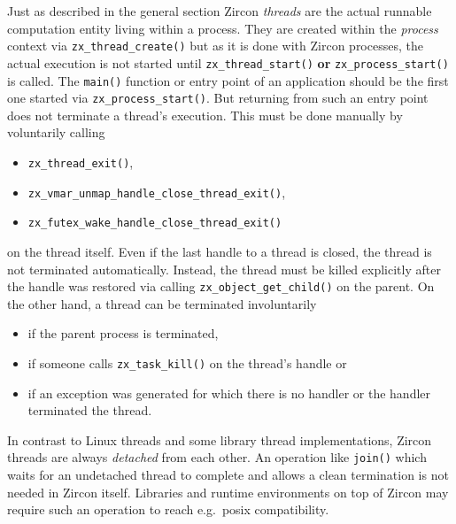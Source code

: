 Just as described in the general section Zircon \textit{threads} are the actual runnable computation entity living within a process.
They are created within the \textit{process} context via \texttt{zx\_thread\_create()} but as it is done with Zircon processes, the actual execution is not started until \texttt{zx\_thread\_start()} \textbf{or} \texttt{zx\_process\_start()} is called.
The \texttt{main()} function or entry point of an application should be the first one started via \texttt{zx\_process\_start()}.
But returning from such an entry point does not terminate a thread's execution.
This must be done manually by voluntarily calling 
\begin{itemize}
    \item \texttt{zx\_thread\_exit()},
    \item \texttt{zx\_vmar\_unmap\_handle\_close\_thread\_exit()},
    \item \texttt{zx\_futex\_wake\_handle\_close\_thread\_exit()}
\end{itemize}
on the thread itself\cite{zircon-thread}.
Even if the last handle to a thread is closed, the thread is not terminated automatically.
Instead, the thread must be killed explicitly after the handle was restored via calling \texttt{zx\_object\_get\_child()} on the parent.
On the other hand, a thread can be terminated involuntarily 
\begin{itemize}
    \item if the parent process is terminated,
    \item if someone calls \texttt{zx\_task\_kill()} on the thread's handle or
    \item if an exception was generated for which there is no handler or the handler terminated the thread\cite{zircon-thread}. 
\end{itemize}

In contrast to Linux threads and some library thread implementations, Zircon threads are always \textit{detached} from each other.
An operation like \texttt{join()} which waits for an undetached thread to complete and allows a clean termination is not needed in Zircon itself.
Libraries and runtime environments on top of Zircon may require such an operation to reach e.g.\ \ac{posix} compatibility\cite{zircon-thread}.


